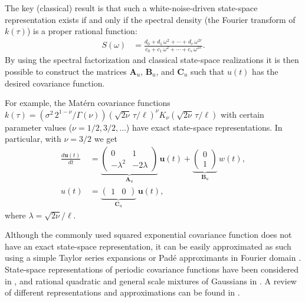 \documentclass[journal]{IEEEtran}
\begin{document}
The key (classical) result is that such a white-noise-driven state-space representation exists if and only if the spectral density (the Fourier transform of $k(\tau)$) is a proper rational function:
%
\begin{equation}
\begin{split}
  S(\omega) &= \frac{d_0 + d_1 \, \omega^2 + \cdots + d_r \, \omega^{2r}}{c_0 + c_1 \, \omega^2 + \cdots + c_s \, \omega^{2s}}.
\end{split}
\end{equation}
%
By using the spectral factorization and classical state-space realizations \cite{Sarkka+Solin+Hartikainen:2013} it is then possible to construct the matrices $\mathbf{A}_u$, $\mathbf{B}_u$, and $\mathbf{C}_u$ such that $u(t)$ has the desired covariance function. 

For example, the Mat\'ern covariance functions  $k(\tau) = \left( \sigma^2 \, 2^{1-\nu} / \Gamma(\nu)\right) \left(\sqrt{2\nu}\,\tau / \ell \right)^\nu K_\nu\left(\sqrt{2\nu}\,\tau / \ell \right)$ with certain parameter values ($\nu=1/2,3/2,\ldots$) have exact state-space representations. In particular, with $\nu=3/2$ we get
\begin{equation}
\begin{split}
\frac{d\mathbf{u}(t)}{dt} &= \underbrace{\begin{pmatrix} 0 & 1 \\ -\lambda^2 & -2\lambda \end{pmatrix}}_{\mathbf{A}_u}
 \, \mathbf{u}(t)
+ \underbrace{\begin{pmatrix} 0 \\ 1 \end{pmatrix}}_{\mathbf{B}_u} \, w(t), \\
   u(t) &= \underbrace{\begin{pmatrix} 1 & 0 \end{pmatrix}}_{\mathbf{C}_u} \, \mathbf{u}(t),
\end{split}
\end{equation}
%
where $\lambda=\sqrt{2\nu}/\ell$. 

Although the commonly used squared exponential covariance function does not have an exact state-space representation, it
can be easily approximated as such using a simple Taylor series expansions or Pad\'e approximants in Fourier domain \cite{Sarkka+Piche:2014,Karvonen+Sarkka:2016}. State-space representations of periodic covariance functions have been considered in \cite{Solin+Sarkka:2014a}, and rational quadratic and general scale mixtures of Gaussians in \cite{Solin+Sarkka:2014b}. A review of different representations and approximations can be found in \cite{Solin:2016}.
\end{document}
